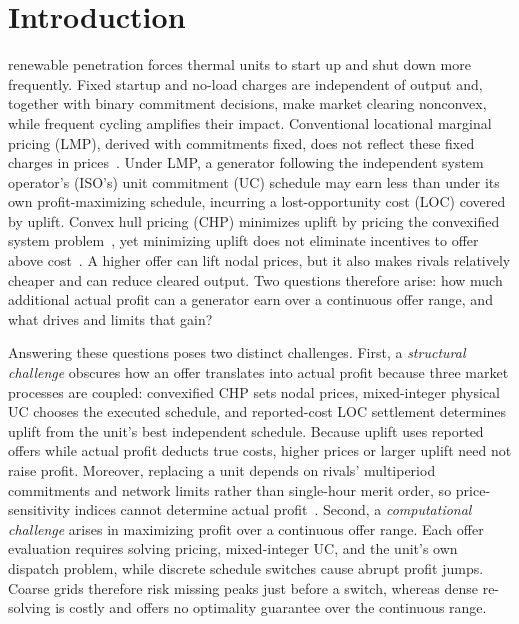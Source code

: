 \documentclass[journal]{IEEEtran}
\begin{document}
\section{Introduction}
\label{sec:introduction}

 renewable penetration forces thermal units to start up and shut down more frequently. Fixed startup and no-load charges are independent of output and, together with binary commitment decisions, make market clearing nonconvex, while frequent cycling amplifies their impact. Conventional locational marginal pricing (LMP), derived with commitments fixed, does not reflect these fixed charges in prices~\cite{schiro2016}. Under LMP, a generator following the independent system operator's (ISO's) unit commitment (UC) schedule may earn less than under its own profit-maximizing schedule, incurring a lost-opportunity cost (LOC) covered by uplift. Convex hull pricing (CHP) minimizes uplift by pricing the convexified system problem~\cite{gribik2007,schiro2016,hua2017}, yet minimizing uplift does not eliminate incentives to offer above cost~\cite{wang2023incentive}. A higher offer can lift nodal prices, but it also makes rivals relatively cheaper and can reduce cleared output. Two questions therefore arise: how much additional actual profit can a generator earn over a continuous offer range, and what drives and limits that gain?

Answering these questions poses two distinct challenges. First, a \emph{structural challenge} obscures how an offer translates into actual profit because three market processes are coupled: convexified CHP sets nodal prices, mixed-integer physical UC chooses the executed schedule, and reported-cost LOC settlement determines uplift from the unit's best independent schedule. Because uplift uses reported offers while actual profit deducts true costs, higher prices or larger uplift need not raise profit. Moreover, replacing a unit depends on rivals' multiperiod commitments and network limits rather than single-hour merit order, so price-sensitivity indices cannot determine actual profit~\cite{palka2017,sun2021temporal}. Second, a \emph{computational challenge} arises in maximizing profit over a continuous offer range. Each offer evaluation requires solving pricing, mixed-integer UC, and the unit's own dispatch problem, while discrete schedule switches cause abrupt profit jumps. Coarse grids therefore risk missing peaks just before a switch, whereas dense re-solving is costly and offers no optimality guarantee over the continuous range.
\end{document}
